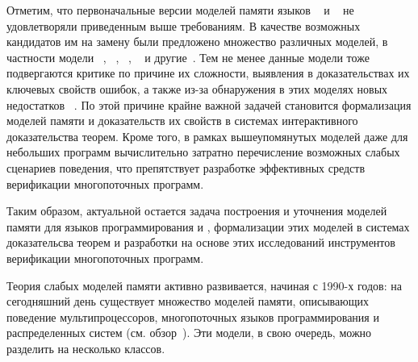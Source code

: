 Отметим, что первоначальные версии моделей памяти языков
\CPP~\autocite{Batty-al:POPL11} и \Java~\autocite{Manson-al:POPL05}
не удовлетворяли приведенным выше требованиям. 
В качестве возможных кандидатов им на замену были предложено множество различных моделей,
в частности модели \Wkm~\autocite{Chakraborty-Vafeiadis:POPL19}, \Prm~\autocite{Kang-al:POPL17}, 
\MRD~\autocite{Paviotti-al:ESOP20}, \PwT~\autocite{Jagadeesan-al:OOPSLA2020,Jeffrey-al:POPL2022}
и другие~\autocite{Jeffrey-Riely:LICS16, PichonPharabod-Sewell:POPL16, Paviotti-al:ESOP20}.
Тем не менее данные модели тоже подвергаются критике по причине их сложности,
выявления в доказательствах их ключевых свойств ошибок,
а также из-за обнаружения в этих моделях новых недостатков%
~\autocite{Paviotti-al:ESOP20,Jagadeesan-al:OOPSLA2020,Lee-al:PLDI20,Cho-al:PLDI21}.
По этой причине крайне важной задачей становится формализация моделей памяти и
доказательств их свойств в системах интерактивного доказательства теорем. 
Кроме того, в рамках вышеупомянутых моделей даже для небольших программ
вычислительно затратно перечисление возможных слабых сценариев поведения,
что препятствует разработке эффективных средств верификации многопоточных программ.

Таким образом, актуальной остается задача построения и уточнения 
моделей памяти для языков программирования \CPP и \Java,
формализации этих моделей в системах доказательсва теорем
и разработки на основе этих исследований инструментов верификации многопоточных программ.

{\progress}

Теория слабых моделей памяти активно развивается, начиная с 1990-х годов: 
на сегодняшний день существует множество моделей памяти, 
описывающих поведение мультипроцессоров, 
многопоточных языков программирования и распределенных систем 
(см. обзор~\cite{Moiseenko-al:PCS21}). 
Эти модели, в свою очередь, можно разделить на несколько классов.


